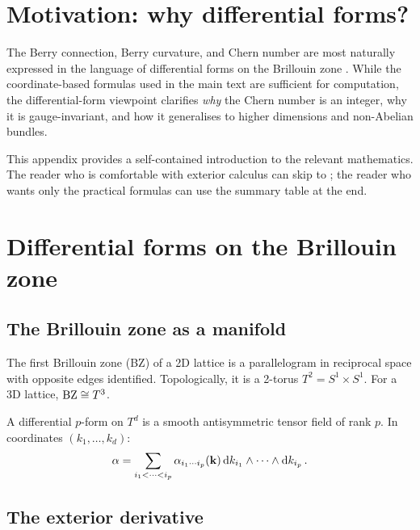 
\section{Motivation: why differential forms?}
\label{sec:appB-motivation}

The Berry connection, Berry curvature, and Chern number are most
naturally expressed in the language of differential forms on the
Brillouin zone \cite{atala2013direct}.  While the coordinate-based formulas used in the main
text are sufficient for computation, the differential-form viewpoint
clarifies \emph{why} the Chern number is an integer, why it is
gauge-invariant, and how it generalises to higher dimensions and
non-Abelian bundles.

This appendix provides a self-contained introduction to the relevant
mathematics.  The reader who is comfortable with exterior calculus can
skip to ; the reader who wants only the
practical formulas can use the summary table at the end.

\section{Differential forms on the Brillouin zone}
\label{sec:appB-forms}

\subsection{The Brillouin zone as a manifold}
\label{sec:appB-bz-manifold}

The first Brillouin zone (BZ) of a 2D lattice is a parallelogram in
reciprocal space with opposite edges identified.  Topologically, it is
a 2-torus $T^2=S^1\times S^1$.  For a 3D lattice, $\mathrm{BZ}\cong T^3$.

A differential $p$-form on $T^d$ is a smooth antisymmetric tensor
field of rank $p$.  In coordinates $(k_1,\ldots,k_d)$:
\begin{equation}\label{eq:appB-p-form}
  \alpha = \sum_{i_1<\cdots<i_p}
  \alpha_{i_1\cdots i_p}(\mathbf{k})\,
  \mathrm{d} k_{i_1}\wedge\cdots\wedge\mathrm{d} k_{i_p}\,.
\end{equation}

\subsection{The exterior derivative}
\label{sec:appB-exterior-d}

